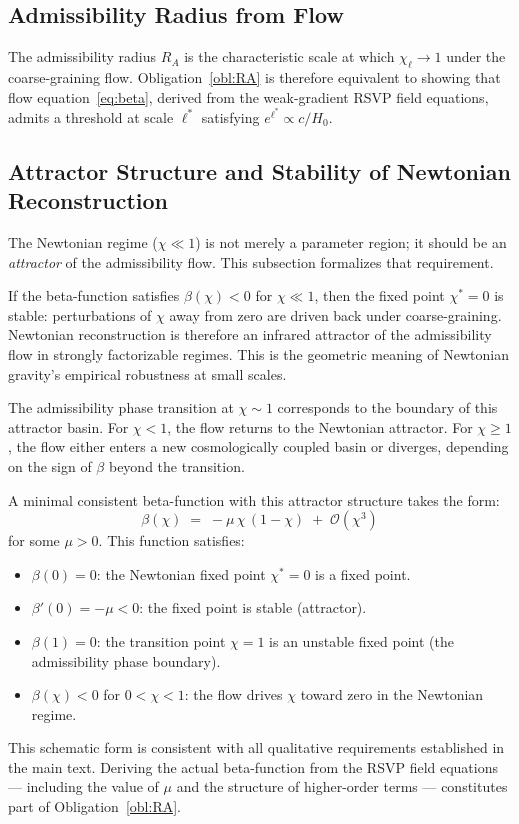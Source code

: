 \documentclass[11pt, a4paper]{article}
\theoremstyle{plain}
\theoremstyle{definition}
\theoremstyle{remark}
\newcommand{\RA}{R_{\!A}}
\begin{document}
\subsection{Admissibility Radius from Flow}

The admissibility radius $\RA$ is the characteristic scale at which $\chi_\ell \to
1$ under the coarse-graining flow. Obligation~\ref{obl:RA} is therefore equivalent
to showing that flow equation~\eqref{eq:beta}, derived from the weak-gradient RSVP
field equations, admits a threshold at scale $\ell^*$ satisfying $e^{\ell^*} \propto
c/H_0$.

\subsection{Attractor Structure and Stability of Newtonian Reconstruction}
\label{app:attractor}

The Newtonian regime ($\chi \ll 1$) is not merely a parameter region; it should be
an \emph{attractor} of the admissibility flow. This subsection formalizes that
requirement.

If the beta-function satisfies $\beta(\chi) < 0$ for $\chi \ll 1$, then the fixed
point $\chi^* = 0$ is stable: perturbations of $\chi$ away from zero are driven back
under coarse-graining. Newtonian reconstruction is therefore an infrared attractor of
the admissibility flow in strongly factorizable regimes. This is the geometric
meaning of Newtonian gravity's empirical robustness at small scales.

The admissibility phase transition at $\chi \sim 1$ corresponds to the boundary of
this attractor basin. For $\chi < 1$, the flow returns to the Newtonian attractor.
For $\chi \geq 1$, the flow either enters a new cosmologically coupled basin or
diverges, depending on the sign of $\beta$ beyond the transition.

A minimal consistent beta-function with this attractor structure takes the form:
\[
  \beta(\chi) \;=\; -\mu\,\chi\,(1 - \chi) \;+\; \mathcal{O}(\chi^3)
\]
for some $\mu > 0$. This function satisfies:
\begin{itemize}
  \item $\beta(0) = 0$: the Newtonian fixed point $\chi^* = 0$ is a fixed point.
  \item $\beta'(0) = -\mu < 0$: the fixed point is stable (attractor).
  \item $\beta(1) = 0$: the transition point $\chi = 1$ is an unstable fixed point
    (the admissibility phase boundary).
  \item $\beta(\chi) < 0$ for $0 < \chi < 1$: the flow drives $\chi$ toward zero
    in the Newtonian regime.
\end{itemize}
This schematic form is consistent with all qualitative requirements established in
the main text. Deriving the actual beta-function from the RSVP field equations ---
including the value of $\mu$ and the structure of higher-order terms --- constitutes
part of Obligation~\ref{obl:RA}.
\end{document}
